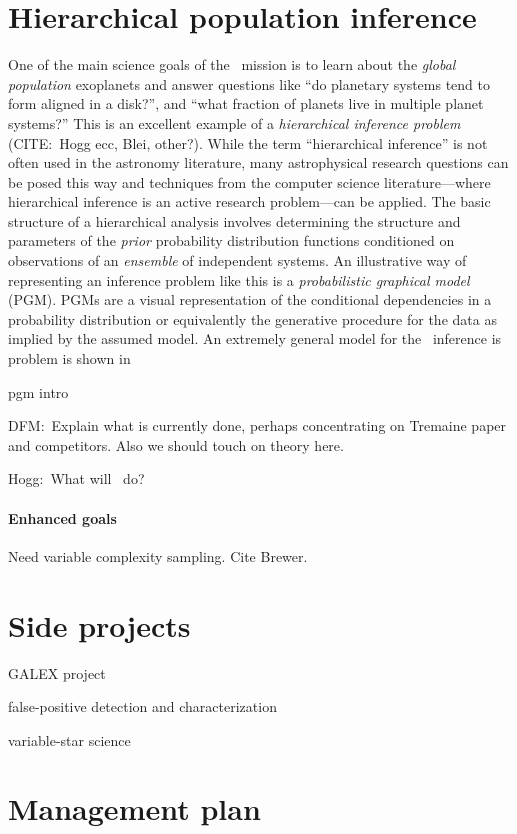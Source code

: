 \documentclass[letterpaper,12pt,preprint]{hack_aastex}
\newcommand{\TheCreator}{\package{TheCreator}}
\begin{document}
\section{Hierarchical population inference}

One of the main science goals of the \Kepler\ mission is to learn about the
\emph{global population} exoplanets and answer questions like ``do planetary
systems tend to form aligned in a disk?'', and ``what fraction of planets live
in multiple planet systems?''
This is an excellent example of a \emph{hierarchical inference problem}
 (CITE:\ Hogg ecc, Blei, other?).
While the term ``hierarchical inference'' is not often used in the astronomy
literature, many astrophysical research questions can be posed this way and
techniques from the computer science literature---where hierarchical inference
is an active research problem---can be applied.
The basic structure of a hierarchical analysis involves determining the
structure and parameters of the \emph{prior} probability distribution
functions conditioned on observations of an \emph{ensemble} of independent
systems.
An illustrative way of representing an inference problem like this is a
\emph{probabilistic graphical model} (PGM).
PGMs are a visual representation of the conditional dependencies in a
probability distribution or equivalently the generative procedure for the data
as implied by the assumed model.
An extremely general model for the \Kepler\ inference is problem is shown in



pgm intro

DFM:\  Explain what is currently done, perhaps concentrating on Tremaine
paper and competitors.  Also we should touch on theory here.

Hogg:\  What will \TheCreator\ do?

\paragraph{Enhanced goals}
Need variable complexity sampling. Cite Brewer.


\section{Side projects}

GALEX project

false-positive detection and characterization

variable-star science

\section{Management plan}
\end{document}
